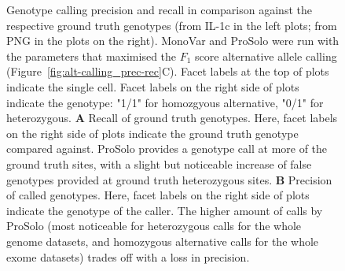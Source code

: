\documentclass[authoryear,preprint,11pt]{scrartcl}
\begin{document}
\begin{figure}[!tpb]
\begin{minipage}{.53\linewidth}
 \end{minipage}
 \caption{
  Genotype calling precision and recall in comparison against the respective ground truth genotypes (from IL-1c in the left plots; from PNG in the plots on the right).
  MonoVar and ProSolo were run with the parameters that maximised the $F_1$ score alternative allele calling (Figure~\ref{fig:alt-calling_prec-rec}C).
  Facet labels at the top of plots indicate the single cell.
  Facet labels on the right side of plots indicate the genotype:
  "1/1" for homozgyous alternative, "0/1" for heterozygous.
  \textbf{A} Recall of ground truth genotypes.
  Here, facet labels on the right side of plots indicate the ground truth genotype compared against.
  ProSolo provides a genotype call at more of the ground truth sites, with a slight but noticeable increase of false genotypes provided at ground truth heterozygous sites.
  \textbf{B} Precision of called genotypes.
  Here, facet labels on the right side of plots indicate the genotype of the caller.
  The higher amount of calls by ProSolo (most noticeable for heterozygous calls for the whole genome datasets, and homozygous alternative calls for the whole exome datasets) trades off with a loss in precision.
  }
\label{fig:gt-calling-true-false-colouring}
\end{figure}
\end{document}
